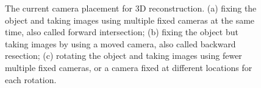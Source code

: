 \begin{figure}[htb]
  \begin{center}
  \end{center}
  \caption[Current photogrammetry (3D reconstruction) methods]{
    The current camera placement for 3D reconstruction. (a) fixing the object and taking images using multiple fixed cameras at the same time, also called forward intersection; (b) fixing the object but taking images by using a moved camera, also called backward resection; (c) rotating the object and taking images using fewer multiple fixed cameras, or a camera fixed at different locations for each rotation.
  }
  \label{fig:des1}
\end{figure}